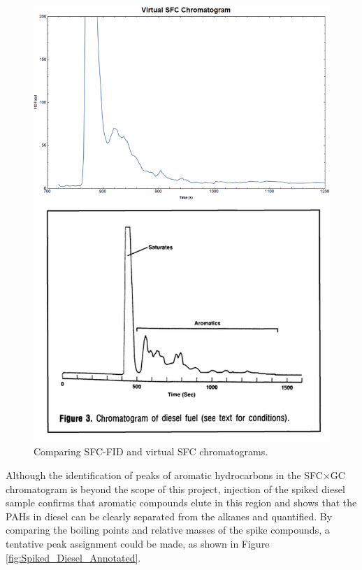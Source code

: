 \begin{figure}
	\centering
	\includegraphics[width=\textwidth]{Figures/VirtualSFC_Compared.png}
	\decoRule	
	
\caption[Comparing SFC-FID and virtual SFC.]{Comparing SFC-FID and virtual SFC chromatograms.}
	
	\label{fig:Virtual_SFC} 
\end{figure}

Although the identification of peaks of aromatic hydrocarbons in the SFC×GC
chromatogram is beyond the scope of this project, injection of the spiked diesel
sample confirms that aromatic compounds elute in this region and shows that the
PAHs in diesel can be clearly separated from the alkanes and quantified. By
comparing the boiling points and relative masses of the spike compounds, a
tentative peak assignment could be made, as shown in Figure
\ref{fig:Spiked_Diesel_Annotated}.

